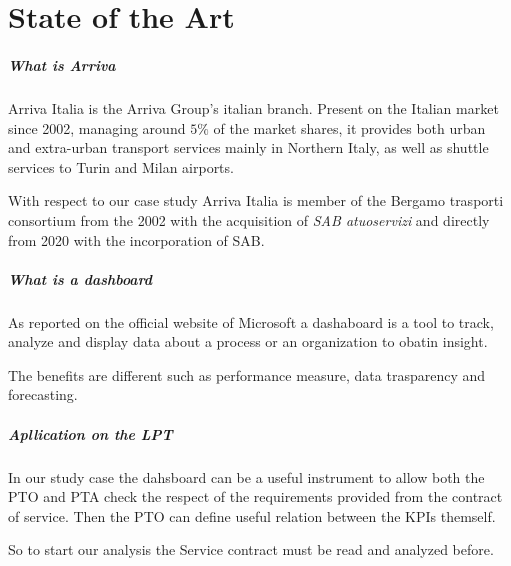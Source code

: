 \chapter{State of the Art}

\paragraph{What is Arriva}
Arriva Italia is the Arriva Group’s italian branch. Present on the Italian market since 2002, managing around $5\%$ of the market shares, it provides both urban and extra-urban transport services mainly in Northern Italy, as well as shuttle services to Turin and Milan airports.

With respect to our case study Arriva Italia is member of the Bergamo trasporti consortium from the 2002 with the acquisition of \emph{SAB atuoservizi} and directly from 2020 with the incorporation of SAB.

\paragraph{What is a dashboard}
As reported on the official website of Microsoft a dashaboard is a tool to track, analyze and display data about a process or an organization to obatin insight.

The benefits are different such as performance measure, data trasparency and forecasting.


\paragraph{Apllication on the LPT}

In our study case the dahsboard can be a useful instrument to allow both the PTO and PTA check the respect of the requirements provided from the contract of service. Then the PTO can define useful relation between the KPIs themself. 

So to start our analysis the Service contract must be read and analyzed before.